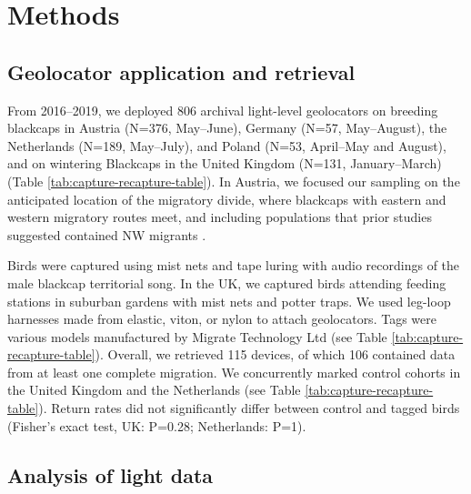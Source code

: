 \documentclass[a4paper, twoside]{templates/ociamthesis}
\begin{document}
\hypertarget{methods}{%
\section{Methods}\label{methods}}

\hypertarget{geolocator-application-and-retrieval}{%
\subsection{Geolocator application and retrieval}\label{geolocator-application-and-retrieval}}

From 2016--2019, we deployed 806 archival light-level geolocators on breeding blackcaps in Austria (N=376, May--June), Germany (N=57, May--August), the Netherlands (N=189, May--July), and Poland (N=53, April--May and August), and on wintering Blackcaps in the United Kingdom (N=131, January--March) (Table \ref{tab:capture-recapture-table}). In Austria, we focused our sampling on the anticipated location of the migratory divide, where blackcaps with eastern and western migratory routes meet, and including populations that prior studies suggested contained NW migrants \autocite{helbigPopulationDifferentiationMigratory1992,helbigSESWmigratingBlackcap1991}.

Birds were captured using mist nets and tape luring with audio recordings of the male blackcap territorial song. In the UK, we captured birds attending feeding stations in suburban gardens with mist nets and potter traps. We used leg-loop harnesses \autocite{rappoleNewHarnessDesign1991} made from elastic, viton, or nylon to attach geolocators. Tags were various models manufactured by Migrate Technology Ltd (see Table \ref{tab:capture-recapture-table}). Overall, we retrieved 115 devices, of which 106 contained data from at least one complete migration. We concurrently marked control cohorts in the United Kingdom and the Netherlands (see Table \ref{tab:capture-recapture-table}). Return rates did not significantly differ between control and tagged birds (Fisher's exact test, UK: P=0.28; Netherlands: P=1).

\hypertarget{analysis-of-light-data}{%
\subsection{Analysis of light data}\label{analysis-of-light-data}}
\end{document}
